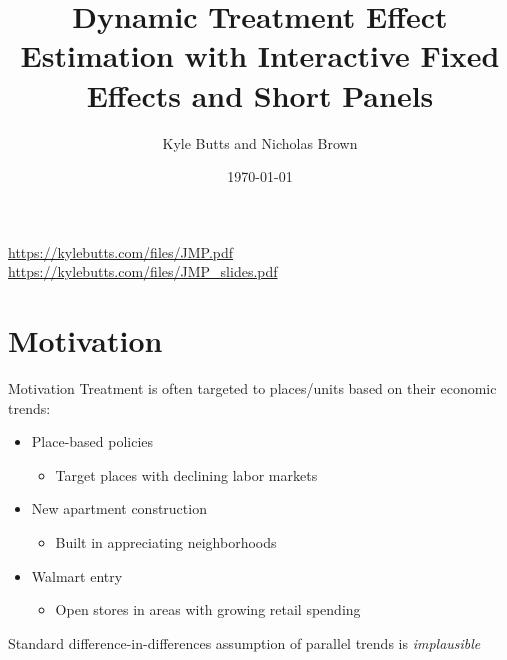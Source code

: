 \documentclass[aspectratio=43,t,11pt]{beamer}
\title{Dynamic Treatment Effect Estimation with Interactive Fixed Effects and Short Panels}
\date{\today}
\author{Kyle Butts and Nicholas Brown}
\begin{document}
\begin{frame}[plain]
  \maketitle

  \vspace{10mm}
  {\footnotesize
    \url{https://kylebutts.com/files/JMP.pdf}\\[-2mm]
    \url{https://kylebutts.com/files/JMP_slides.pdf}
  }
\end{frame}

\section{Motivation}

\begin{frame}{Motivation}
  Treatment is often targeted to places/units based on their economic trends:

  \begin{itemize}
    \item Place-based policies 
    \begin{itemize}
      \item Target places with declining labor markets 
    \end{itemize}
    
    \item New apartment construction 
    \begin{itemize}
      \item Built in appreciating neighborhoods
    \end{itemize} 

    \item Walmart entry 
    \begin{itemize}
      \item Open stores in areas with growing retail spending
    \end{itemize}
  \end{itemize}

  \bigskip
  Standard difference-in-differences assumption of parallel trends is \emph{implausible}
\end{frame}
\end{document}
